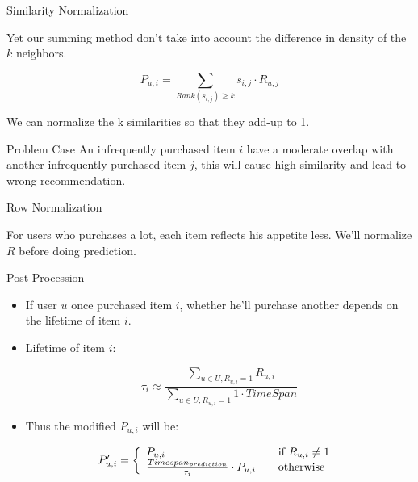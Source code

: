 \documentclass{beamer}
\begin{document}
\begin{frame}{Similarity Normalization}

Yet our summing method don't take into account the difference in density of the $k$ neighbors.

\begin{equation}
P_{u,i} = \sum_{Rank(s_{i,j})\geq k} s_{i,j} \cdot R_{u,j}
\end{equation}

We can normalize the k similarities so that they add-up to 1.

\begin{exampleblock}{Problem Case}
An infrequently purchased item $i$ have a moderate overlap with another infrequently purchased item $j$, this will cause high similarity and lead to wrong recommendation.
\end{exampleblock}

\end{frame}


\begin{frame}{Row Normalization}

For users who purchases a lot, each item reflects his appetite less. We'll normalize $R$ before doing prediction.

\end{frame}


\begin{frame}{Post Procession}

\begin{itemize}
\item If user $u$ once purchased item $i$, whether he'll purchase another depends on the lifetime of item $i$.
\item Lifetime of item $i$:

    \begin{equation}
    \tau_i \approx \frac{\sum_{u \in U, R_{u,i}=1} R_{u,i}}{\sum_{u \in U, R_{u,i}=1}1 \cdot TimeSpan}
    \end{equation}

\item Thus the modified $P_{u,i}$ will be:

    \begin{equation}
        P'_{u,i} = \left\{ 
        \begin{array}{l l}
        P_{u,i} & \quad \text{if $R_{u,i} \neq 1$ }\\
        \frac{Timespan_{prediction}}{\tau_i} \cdot P_{u,i} & \quad \text{otherwise}
        \end{array} \right.
    \end{equation}

\end{itemize}

\end{frame}
\end{document}
